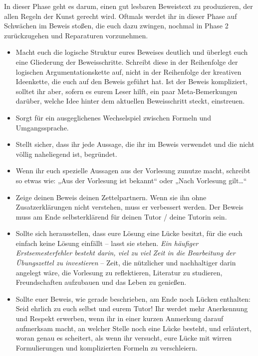 \begin{phasethree}[Aufschreiben]
    In dieser Phase geht es darum, einen gut lesbaren Beweistext zu produzieren, der allen Regeln der Kunst gerecht wird. Oftmals werdet ihr in dieser Phase auf Schwächen im Beweis stoßen, die euch dazu zwingen, nochmal in Phase 2 zurückzugehen und Reparaturen vorzunehmen.
    \begin{itemize}
        \item Macht euch die logische Struktur eures Beweises deutlich und überlegt euch eine Gliederung der Beweisschritte. Schreibt diese in der Reihenfolge der logischen Argumentationskette auf, nicht in der Reihenfolge der kreativen Ideenkette, die euch auf den Beweis geführt hat. Ist der Beweis kompliziert, solltet ihr aber, sofern es eurem Leser hilft, ein paar Meta-Bemerkungen darüber, welche Idee hinter dem aktuellen Beweisschritt steckt, einstreuen.
        \item Sorgt für ein ausgeglichenes Wechselspiel zwischen Formeln und Umgangssprache.
        \item Stellt sicher, dass ihr jede Aussage, die ihr im Beweis verwendet und die nicht völlig naheliegend ist, begründet.
        \item Wenn ihr euch spezielle Aussagen aus der Vorlesung zunutze macht, schreibt so etwas wie: „Aus der Vorlesung ist bekannt“ oder „Nach Vorlesung gilt\dots“
        \item Zeige deinen Beweis deinen Zettelpartnern. Wenn sie ihn ohne Zusatzerklärungen nicht verstehen, muss er verbessert werden. Der Beweis muss am Ende selbsterklärend für deinen Tutor / deine Tutorin sein.
        \item Sollte sich herausstellen, dass eure Lösung eine Lücke besitzt, für die euch einfach keine Lösung einfällt -- lasst sie stehen. \emph{Ein häufiger Erstsemesterfehler besteht darin, viel zu viel Zeit in die Bearbeitung der Übungszettel zu investieren} -- Zeit, die nützlicher und nachhaltiger darin angelegt wäre, die Vorlesung zu reflektieren, Literatur zu studieren, Freundschaften aufzubauen und das Leben zu genießen.
        \item Sollte euer Beweis, wie gerade beschrieben, am Ende noch Lücken enthalten: Seid ehrlich zu euch selbst und eurem Tutor! Ihr werdet mehr Anerkennung und Respekt erwerben, wenn ihr in einer kurzen Anmerkung darauf aufmerksam macht, an welcher Stelle noch eine Lücke besteht, und erläutert, woran genau es scheitert, als wenn ihr versucht, eure Lücke mit wirren Formulierungen und komplizierten Formeln zu verschleiern.

\end{itemize}
\end{phasethree}
